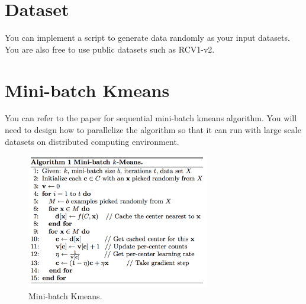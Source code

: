 \documentclass{article}
\begin{document}
\section*{Dataset}
You can implement a script to  generate data randomly as your input datasets.  You are also free to use public datasets such as RCV1-v2\cite{RCV1-v2}.
  
\section*{Mini-batch Kmeans}
You can refer to the paper\cite{sculley2010web} for sequential mini-batch kmeans algorithm. You will need to design how to parallelize the algorithm so that it can run with large scale datasets on distributed computing environment.

\begin{figure}[H]
\includegraphics[width=8cm]{mbkmeans}
\centering
\caption{Mini-batch Kmeans.\cite{sculley2010web} }
\end{figure}  




 
 
\end{document}
